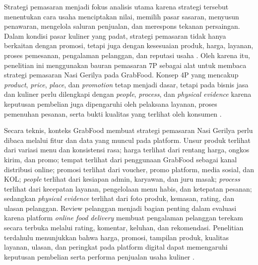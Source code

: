 \enlargethispage{\baselineskip}
Strategi pemasaran menjadi fokus analisis utama karena strategi tersebut menentukan cara usaha menciptakan nilai, memilih pasar sasaran, menyusun penawaran, mengelola saluran penjualan, dan merespons tekanan persaingan. Dalam kondisi pasar kuliner yang padat, strategi pemasaran tidak hanya berkaitan dengan promosi, tetapi juga dengan kesesuaian produk, harga, layanan, proses pemesanan, pengalaman pelanggan, dan reputasi usaha \parencite{kotler2023principlesmarketing,wirtz2024servicesmarketing}. Oleh karena itu, penelitian ini menggunakan bauran pemasaran 7P sebagai alat untuk membaca strategi pemasaran Nasi Gerilya pada GrabFood. Konsep 4P yang mencakup \textit{product}, \textit{price}, \textit{place}, dan \textit{promotion} tetap menjadi dasar, tetapi pada bisnis jasa dan kuliner perlu dilengkapi dengan \textit{people}, \textit{process}, dan \textit{physical evidence} karena keputusan pembelian juga dipengaruhi oleh pelaksana layanan, proses pemenuhan pesanan, serta bukti kualitas yang terlihat oleh konsumen \parencite{kotler2023principlesmarketing,wirtz2024servicesmarketing}.

Secara teknis, konteks GrabFood membuat strategi pemasaran Nasi Gerilya perlu dibaca melalui fitur dan data yang muncul pada platform. Unsur produk terlihat dari variasi menu dan konsistensi rasa; harga terlihat dari rentang harga, ongkos kirim, dan promo; tempat terlihat dari penggunaan GrabFood sebagai kanal distribusi online; promosi terlihat dari voucher, promo platform, media sosial, dan KOL; \textit{people} terlihat dari kesiapan admin, karyawan, dan juru masak; \textit{process} terlihat dari kecepatan layanan, pengelolaan menu habis, dan ketepatan pesanan; sedangkan \textit{physical evidence} terlihat dari foto produk, kemasan, rating, dan ulasan pelanggan. Review pelanggan menjadi bagian penting dalam evaluasi karena platform \textit{online food delivery} membuat pengalaman pelanggan terekam secara terbuka melalui rating, komentar, keluhan, dan rekomendasi. Penelitian terdahulu menunjukkan bahwa harga, promosi, tampilan produk, kualitas layanan, ulasan, dan peringkat pada platform digital dapat memengaruhi keputusan pembelian serta performa penjualan usaha kuliner \parencite{sophia2025rendanggadih,ruhiyat2023minatbeli,khairani2022buahsayur,suharjo2020bogorsnacks}.

